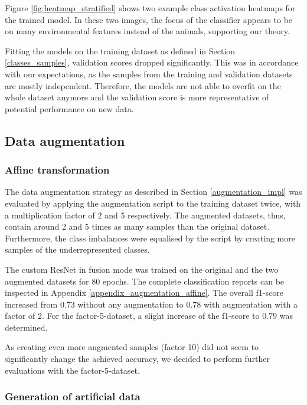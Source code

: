 \documentclass{l4proj}
\begin{document}
Figure \ref{fig:heatmap_stratified} shows two example class activation heatmaps for the trained model. In these two images, the focus of the classifier appears to be on many environmental features instead of the animals, supporting our theory.

Fitting the models on the training dataset as defined in Section \ref{classes_samples}, validation scores dropped significantly. This was in accordance with our expectations, as the samples from the training and validation datasets are mostly independent. Therefore, the models are not able to overfit on the whole dataset anymore and the validation score is more representative of potential performance on new data.

\subsection{Data augmentation}

\subsubsection{Affine transformation}

The data augmentation strategy as described in Section \ref{augmentation_impl} was evaluated by applying the augmentation script to the training dataset twice, with a multiplication factor of 2 and 5 respectively. The augmented datasets, thus, contain around 2 and 5 times as many samples than the original dataset. Furthermore, the class imbalances were equalised by the script by creating more samples of the underrepresented classes.

The custom ResNet in fusion mode was trained on the original and the two augmented datasets for 80 epochs. The complete classification reports can be inspected in Appendix \ref{appendix_augmentation_affine}. The overall f1-score increased from $0.73$ without any augmentation to $0.78$ with augmentation with a factor of 2. For the factor-5-dataset, a slight increase of the f1-score to $0.79$ was determined. 

As creating even more augmented samples (factor 10) did not seem to significantly change the achieved accuracy, we decided to perform further evaluations with the factor-5-dataset.

\subsubsection{Generation of artificial data}
\end{document}
